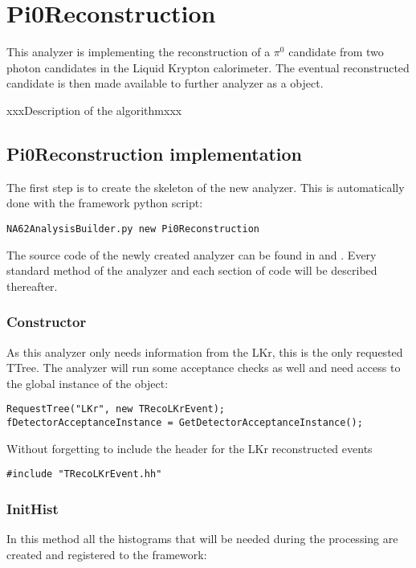 \section{Pi0Reconstruction}

This analyzer is implementing the reconstruction of a $\pi^0$ candidate from two photon candidates
in the Liquid Krypton calorimeter. The eventual reconstructed candidate is then made available to
further analyzer as a  object. 

xxxDescription of the algorithmxxx

\subsection{Pi0Reconstruction implementation}

The first step is to create the skeleton of the new analyzer. This is
automatically done with the framework python script:
\begin{lstlisting}
NA62AnalysisBuilder.py new Pi0Reconstruction
\end{lstlisting}

The source code of the newly created analyzer can be found in
 and .
Every standard method of the analyzer and each section of code will be described thereafter.

\subsubsection{Constructor}
As this analyzer only needs information from the LKr, this is the only requested TTree. The
analyzer will run some acceptance checks as well and need access to the global instance of the
 object:

\begin{lstlisting}
RequestTree("LKr", new TRecoLKrEvent);
fDetectorAcceptanceInstance = GetDetectorAcceptanceInstance();
\end{lstlisting}

Without forgetting to include the header for the LKr reconstructed events

\begin{lstlisting}
#include "TRecoLKrEvent.hh"
\end{lstlisting}


\subsubsection{InitHist}
In this method all the histograms that will be needed during the processing are created and
registered to the framework:

